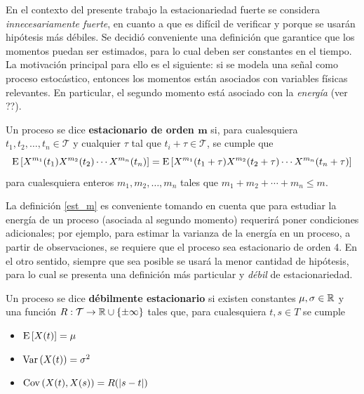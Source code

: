 En el contexto del presente trabajo la estacionariedad fuerte se considera \textit{innecesariamente fuerte}, en cuanto a que es difícil de verificar y porque se usarán hipótesis más débiles.
%
Se decidió conveniente una definición que garantice que los momentos puedan ser estimados, para lo cual deben ser constantes en el tiempo.
%
La motivación principal para ello es el siguiente: si se modela una señal como proceso estocástico, entonces los momentos están asociados con variables físicas relevantes. 
%
En particular, el segundo momento está asociado con la \textit{energía} (ver ??).

\begin{definicion}%
Un proceso \xt se dice \textbf{estacionario de orden $\boldsymbol{m}$} si, para cualesquiera $t_1, t_2, \dots, t_n \in \mathcal{T}$ y cualquier $\tau$ tal que $t_i + \tau \in \mathcal{T}$, se cumple que
\begin{equation*}
\mathrm{E}\left[ X^{m_1}(t_1)X^{m_2}(t_2)\cdots X^{m_n}(t_n) \right] =
\mathrm{E}\left[ X^{m_1}(t_1+\tau)X^{m_2}(t_2+\tau)\cdots X^{m_n}(t_n+\tau) \right]
\end{equation*}
para cualesquiera enteros $m_1, m_2, \dots, m_n$ tales que $m_1+m_2+\cdots+m_n \leq m$.
\label{est_m}
\end{definicion}

La definición \ref{est_m} es conveniente tomando en cuenta que para estudiar la energía de un proceso (asociada al segundo momento) requerirá poner condiciones adicionales; por ejemplo, para estimar la varianza de la energía en un proceso, a partir de observaciones, se requiere que el proceso sea estacionario de orden 4.
%
En el otro sentido, siempre que sea posible se usará la menor cantidad de hipótesis, para lo cual se presenta una definición más particular y \textit{débil} de estacionariedad.

\begin{definicion}%
Un proceso \xt se dice \textbf{débilmente estacionario} si existen constantes $\mu, \sigma \in \mathbb{R}$ y una función $R : \mathcal{T} \rightarrow \mathbb{R} \cup \{ \pm \infty \} $ tales que, para cualesquiera $t, s \in T$ se 
cumple
\begin{itemize}
\item $\mathrm{E}\left[ X(t) \right] = \mu$
\item $\mathrm{Var}\left( X(t) \right) = \sigma^{2}$
\item $\mathrm{Cov}\left( X(t),X(s) \right) = R(\left| s-t \right|)$
\end{itemize}
\end{definicion}

